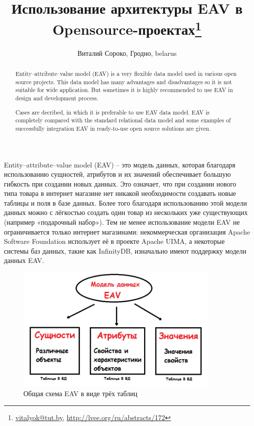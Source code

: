 \documentclass[10pt, a5paper]{article}
\begin{document}
\title{Использование архитектуры  EAV в Opensource-проектах\footnote{\url{vitalyok@tut.by}, \url{http://lvee.org/ru/abstracts/172}}}
\author{Виталий Сороко, Гродно, belarus}
\maketitle
\begin{abstract}
Entity–attribute–value model (EAV) is a very flexible data model used in various open source projects. This data model has many advantages and disadvantages so it is not suitable for wide application. But sometimes it is highly recommended to use EAV in design and development process.

Cases are decribed, in which it is preferable to use EAV data model. EAV is completely compared with the standard relational data model and  some examples of  successfully integration EAV in ready-to-use open source solutions are given.
\end{abstract}

Entity–attribute–value model (EAV) – это модель данных, которая благодаря использованию сущностей, атрибутов и их значений обеспечивает большую гибкость при создании новых данных. Это означает, что при создании нового типа товара в интернет магазине нет никакой необходимости создавать новые таблицы и поля в базе данных. Более того благодаря использованию этой модели данных можно с лёгкостью создать один товар из нескольких уже существующих (например «подарочный набор»). Тем не менее использование модели  EAV не ограничивается только интернет магазинами: некоммерческая организация Apache Software Foundation использует её в проекте Apache UIMA, а некоторые системы баз данных, такие как InfinityDB, изначально имеют поддержку модели данных EAV.

\begin{figure}[h!]
  \centering
  \includegraphics[width=10cm]{w_10_2016_Soroko1.png}
  \caption {Общая схема EAV в виде трёх таблиц}\label{Soroko1}
\end{figure} 
\end{document}
